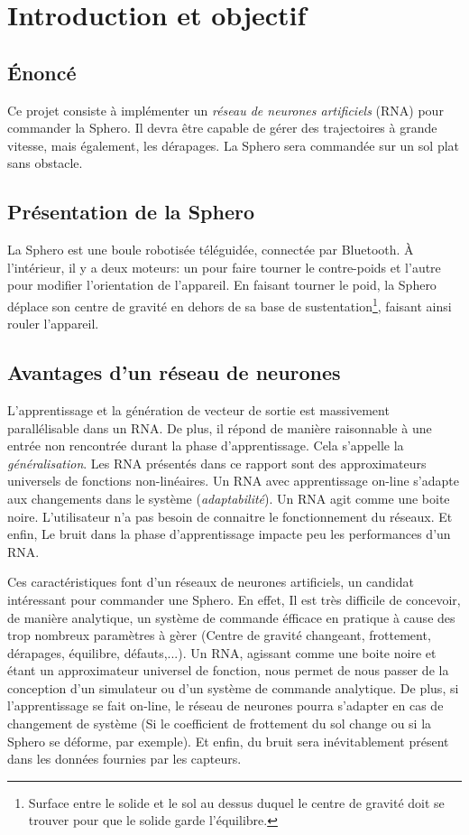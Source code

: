 \section{Introduction et objectif}
\subsection{Énoncé}
Ce projet consiste à implémenter un \emph{réseau de neurones artificiels} \hypertarget{rna}{(RNA)} pour commander la Sphero.
Il devra être capable de gérer des trajectoires à grande vitesse, mais également, les dérapages.
La Sphero sera commandée sur un sol plat sans obstacle.
\subsection{Présentation de la Sphero}
La Sphero est une boule robotisée téléguidée, connectée par Bluetooth.
À l'intérieur, il y a deux moteurs: un pour faire tourner le contre-poids et l'autre pour modifier l'orientation de l'appareil.
En faisant tourner le poid, la Sphero déplace son centre de gravité en dehors de sa base de sustentation\footnote{Surface entre le solide et le sol au dessus duquel le centre de gravité doit se trouver pour que le solide garde l'équilibre.}, faisant ainsi rouler l'appareil.
\subsection{Avantages d'un réseau de neurones}

L'apprentissage et la génération de vecteur de sortie est massivement parallélisable dans un RNA.\cite{corelet,Haykin}
De plus, il répond de manière raisonnable à une entrée non rencontrée durant la phase d'apprentissage. Cela s'appelle la \emph{généralisation}.\cite{statistica,Haykin}
Les RNA présentés dans ce rapport sont des approximateurs universels de fonctions non-linéaires.\cite{Haykin}
Un RNA avec apprentissage on-line s'adapte aux changements dans le système (\emph{adaptabilité}).\cite{Haykin}
Un RNA agit comme une boite noire. L'utilisateur n'a pas besoin de connaitre le fonctionnement du réseaux.
Et enfin, Le bruit dans la phase d'apprentissage impacte peu les performances d'un RNA.\cite{Haykin}

Ces caractéristiques font d'un réseaux de neurones artificiels, un candidat intéressant pour commander une Sphero. 
En effet, Il est très difficile de concevoir, de manière analytique, un système de commande éfficace en pratique à cause des trop nombreux paramètres à gèrer (Centre de gravité changeant, frottement, dérapages, équilibre, défauts,...).
Un RNA, agissant comme une boite noire et étant un approximateur universel de fonction, nous permet de nous passer de la conception d'un simulateur ou d'un système de commande analytique.
De plus, si l'apprentissage se fait on-line, le réseau de neurones pourra s'adapter en cas de changement de système (Si le coefficient de frottement du sol change ou si la Sphero se déforme, par exemple).
Et enfin, du bruit sera inévitablement présent dans les données fournies par les capteurs.
